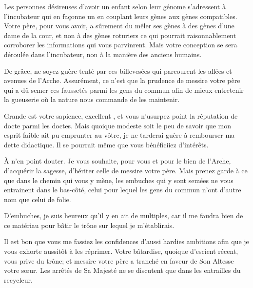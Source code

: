 \begin{drama}
  Les personnes désireuses d’avoir un enfant selon leur génome s’adressent à l’incubateur qui en façonne un en couplant leurs gènes aux gènes compatibles. Votre père, pour vous avoir, a sûrement du mêler ses gènes à des gènes d’une dame de la cour, et non à des gènes roturiers ce qui pourrait raisonnablement corroborer les informations qui vous parvinrent. Mais votre conception se sera déroulée dans l’incubateur, non à la manière des anciens humains.

  De grâce, ne soyez guère tenté par ces billevesées qui parcourent les allées et avenues de l’Arche. Assurément, ce n’est que la prudence de messire votre père qui a dû semer ces faussetés parmi les gens du commun afin de mieux entretenir la gueuserie où la nature nous commande de les maintenir.

  \elenaspeaks Grande est votre sapience, excellent \alexas{}, et vous n’usurpez point la réputation de docte parmi les doctes. Mais quoique modeste soit le peu de savoir que mon esprit faible ait pu emprunter au vôtre, je ne tarderai guère à rembourser ma dette didactique. Il se pourrait même que vous bénéficiiez d’intérêts.

  \alexasspeaks À n’en point douter. Je vous souhaite, pour vous et pour le bien de l’Arche, d’acquérir la sagesse, d’hériter celle de messire votre père. Mais prenez garde à ce que dans le chemin qui vous y mène, les embuches qui y sont semées  ne vous entrainent dans le bas-côté, celui pour lequel les gens du commun n’ont d’autre nom que celui de folie. 

  \elenaspeaks D’embuches, %
  je suis heureux qu’il y en ait de multiples, car %
  il me faudra bien de ce matériau pour bâtir le trône sur lequel je m’établirais.

  \alexasspeaks Il est bon que vous me fassiez les confidences d’aussi hardies ambitions afin que je vous exhorte aussitôt à les réprimer. Votre bâtardise, quoique d’escient récent, vous prive du trône; et messire votre père a tranché en faveur de Son Altesse votre sœur. Les arrêtés de Sa Majesté ne se discutent que dans les entrailles du recycleur.


\end{drama}
